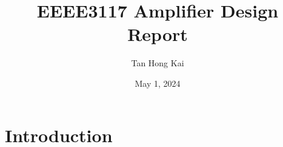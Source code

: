\documentclass{article}
\title{EEEE3117 Amplifier Design Report}
\author{Tan Hong Kai}
\date{May 1, 2024}
\begin{document}
\maketitle

\section{Introduction}
\end{document}

